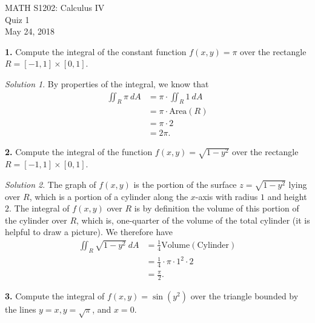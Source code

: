 \documentclass{article}
\theoremstyle{remark}
\newtheorem*{solution}{Solution}
\begin{document}
\begin{center}
MATH S1202: Calculus IV \\ 
Quiz 1 \\
May 24, 2018
\end{center}

\noindent \textbf{1.} Compute the integral of the constant function $f(x,y) = \pi$ over the rectangle $R = [-1,1] \times [0,1]$. 

{\color{blue}
\begin{solution}
By properties of the integral, we know that 
\begin{align*}
\iint_{R} \pi \: dA &= \pi \cdot \iint_{R} 1 \: dA \\
&= \pi \cdot \text{Area}(R) \\
&= \pi \cdot 2 \\
&= 2\pi.
\end{align*}
\end{solution}}

\medskip 

\noindent \textbf{2.} Compute the integral of the function $f(x,y) = \sqrt{1-y^2}$ over the rectangle $R = [-1,1] \times [0,1]$. 

{\color{blue}
\begin{solution}
The graph of $f(x,y)$ is the portion of the surface $z = \sqrt{1-y^2}$ lying over $R$, which is a portion of a cylinder along the $x$-axis with radius $1$ and height $2$. The integral of $f(x,y)$ over $R$ is by definition the volume of this portion of the cylinder over $R$, which is, one-quarter of the volume of the total cylinder (it is helpful to draw a picture). We therefore have 
\begin{align*}
\iint_R \sqrt{1-y^2} \: dA &= \frac{1}{4} \text{Volume}(\text{Cylinder}) \\
&= \frac{1}{4} \cdot  \pi \cdot 1^2 \cdot 2 \\
&= \frac{\pi}{2}. 
\end{align*}
\end{solution}}

\medskip

\noindent \textbf{3.} Compute the integral of $f(x,y) = \sin(y^2)$ over the triangle bounded by the lines $y = x, y=\sqrt{\pi}$, and $x = 0$. 
\end{document}
